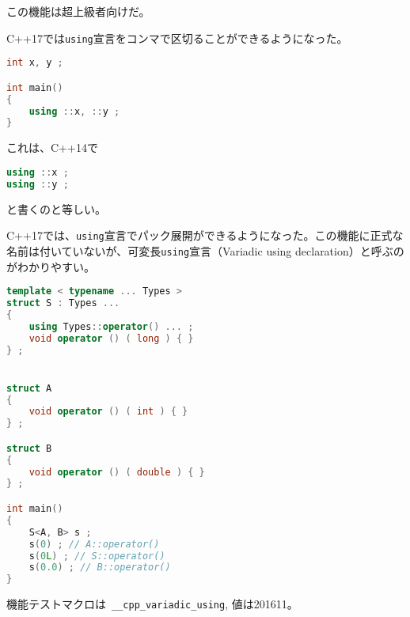 %

この機能は超上級者向けだ。

C++17では\lstinline!using!宣言をコンマで区切ることができるようになった。

\begin{lstlisting}[language=C++]
int x, y ;

int main()
{
    using ::x, ::y ;
}
\end{lstlisting}

これは、C++14で
\begin{lstlisting}[language=C++]
using ::x ;
using ::y ;
\end{lstlisting}
と書くのと等しい。

C++17では、\lstinline!using!宣言でパック展開ができるようになった。この機能に正式な名前は付いていないが、可変長\lstinline!using!宣言（Variadic
using declaration）と呼ぶのがわかりやすい。

\begin{lstlisting}[language=C++]
template < typename ... Types >
struct S : Types ...
{
    using Types::operator() ... ;
    void operator () ( long ) { }
} ;


struct A
{
    void operator () ( int ) { }
} ;

struct B
{
    void operator () ( double ) { }
} ;

int main()
{
    S<A, B> s ;
    s(0) ; // A::operator()
    s(0L) ; // S::operator()
    s(0.0) ; // B::operator()
}
\end{lstlisting}

機能テストマクロは~\lstinline!__cpp_variadic_using!, 値は201611。

